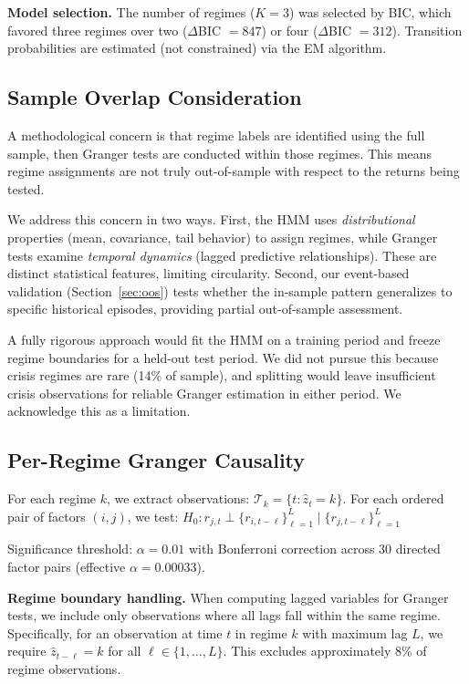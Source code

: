 \documentclass[sigconf]{acmart}
\begin{document}
\textbf{Model selection.} The number of regimes ($K=3$) was selected by BIC, which
favored three regimes over two ($\Delta$BIC $= 847$) or four ($\Delta$BIC $= 312$).
Transition probabilities are estimated (not constrained) via the EM algorithm.

\subsection{Sample Overlap Consideration}
\label{sec:overlap}

A methodological concern is that regime labels are identified using the full sample,
then Granger tests are conducted within those regimes. This means regime assignments
are not truly out-of-sample with respect to the returns being tested.

We address this concern in two ways. First, the HMM uses \emph{distributional}
properties (mean, covariance, tail behavior) to assign regimes, while Granger
tests examine \emph{temporal dynamics} (lagged predictive relationships). These
are distinct statistical features, limiting circularity. Second, our event-based
validation (Section~\ref{sec:oos}) tests whether the in-sample pattern generalizes
to specific historical episodes, providing partial out-of-sample assessment.

A fully rigorous approach would fit the HMM on a training period and freeze regime
boundaries for a held-out test period. We did not pursue this because crisis regimes
are rare (14\% of sample), and splitting would leave insufficient crisis observations
for reliable Granger estimation in either period. We acknowledge this as a limitation.

\subsection{Per-Regime Granger Causality}

For each regime $k$, we extract observations: $\mathcal{T}_k = \{t : \hat{z}_t = k\}$.
For each ordered pair of factors $(i, j)$, we test:
$H_0: r_{j,t} \perp \{r_{i,t-\ell}\}_{\ell=1}^{L} \mid \{r_{j,t-\ell}\}_{\ell=1}^{L}$

Significance threshold: $\alpha = 0.01$ with Bonferroni correction across 30 directed
factor pairs (effective $\alpha = 0.00033$).

\textbf{Regime boundary handling.} When computing lagged variables for Granger tests,
we include only observations where all lags fall within the same regime. Specifically,
for an observation at time $t$ in regime $k$ with maximum lag $L$, we require
$\hat{z}_{t-\ell} = k$ for all $\ell \in \{1, \ldots, L\}$. This excludes approximately
8\% of regime observations.
\end{document}
